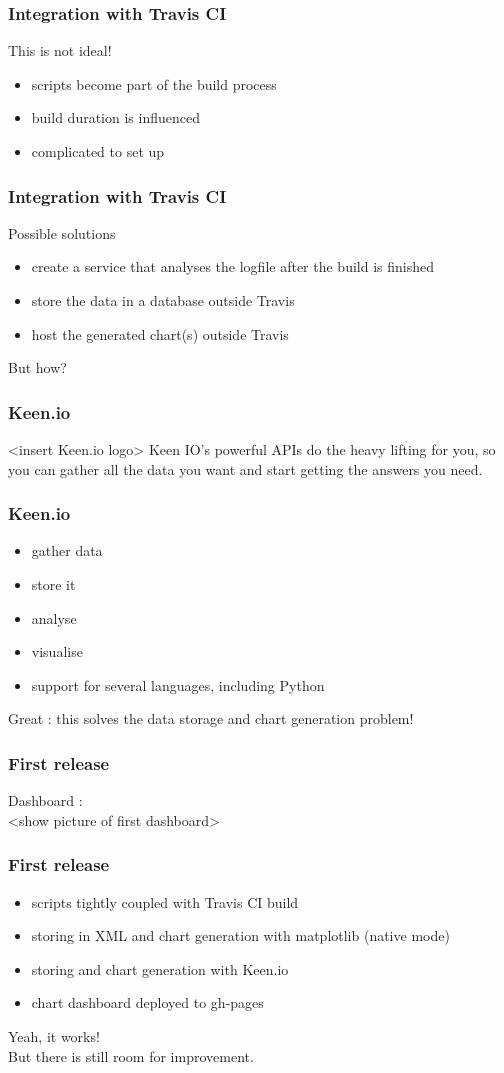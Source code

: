 \documentclass[14pt]{beamer}
\begin{document}
  \begin{frame}
    \frametitle{Integration with Travis CI}
    This is not ideal!
    \begin{itemize}
      \item scripts become part of the build process
      \item build duration is influenced
      \item complicated to set up
    \end{itemize}
  \end{frame}
  \begin{frame}
    \frametitle{Integration with Travis CI}
    Possible solutions
    \begin{itemize}
      \item create a service that analyses the logfile after the build is finished
      \item store the data in a database outside Travis
      \item host the generated chart(s) outside Travis
    \end{itemize}
    But how?
  \end{frame}
  \begin{frame}
    \frametitle{Keen.io}
    <insert Keen.io logo>
    Keen IO's powerful APIs do the heavy lifting for you, so you can gather all the data you want and start getting the answers you need. 
  \end{frame}
  \begin{frame}
    \frametitle{Keen.io}
    \begin{itemize}
      \item gather data
      \item store it
      \item analyse
      \item visualise
      \item support for several languages, including Python
    \end{itemize}
    Great : this solves the data storage and chart generation problem!
  \end{frame}
  \begin{frame}
    \frametitle{First release}
    Dashboard :\\
    <show picture of first dashboard>
  \end{frame}
  \begin{frame}
    \frametitle{First release}
    \begin{itemize}
      \item scripts tightly coupled with Travis CI build
      \item storing in XML and chart generation with matplotlib (native mode)
      \item storing and chart generation with Keen.io
      \item chart dashboard deployed to gh-pages
    \end{itemize}
   Yeah, it works!\\
    \pause
    But there is still room for improvement.
  \end{frame}
\end{document}
